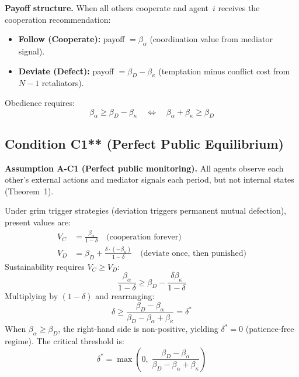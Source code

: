 \documentclass[11pt]{article}
\begin{document}
\textbf{Payoff structure.} When all others cooperate and agent~$i$ receives the cooperation recommendation:
\begin{itemize}
\item \textbf{Follow (Cooperate):} payoff $= \beta_\alpha$ (coordination value from mediator signal).
\item \textbf{Deviate (Defect):} payoff $= \beta_D - \beta_\kappa$ (temptation minus conflict cost from $N{-}1$ retaliators).
\end{itemize}
Obedience requires:
\begin{equation}
\beta_\alpha \geq \beta_D - \beta_\kappa \quad \Longleftrightarrow \quad \beta_\alpha + \beta_\kappa \geq \beta_D
\end{equation}

\subsection{Condition C1** (Perfect Public Equilibrium)}
\label{sec:S4.2}

\textbf{Assumption A-C1 (Perfect public monitoring).} All agents observe each other's external actions and mediator signals each period, but not internal states (Theorem~1).

Under grim trigger strategies (deviation triggers permanent mutual defection), present values are:
\begin{align}
V_C &= \frac{\beta_\alpha}{1 - \delta} \quad \text{(cooperation forever)} \\
V_D &= \beta_D + \frac{\delta \cdot (-\beta_\kappa)}{1 - \delta} \quad \text{(deviate once, then punished)}
\end{align}
Sustainability requires $V_C \geq V_D$:
\begin{equation}
\frac{\beta_\alpha}{1-\delta} \geq \beta_D - \frac{\delta \beta_\kappa}{1-\delta}
\end{equation}
Multiplying by $(1-\delta)$ and rearranging:
\begin{equation}
\delta \geq \frac{\beta_D - \beta_\alpha}{\beta_D - \beta_\alpha + \beta_\kappa} = \delta^*
\end{equation}
When $\beta_\alpha \geq \beta_D$, the right-hand side is non-positive, yielding $\delta^* = 0$ (patience-free regime). The critical threshold is:
\begin{equation}
\delta^* = \max\left(0,\; \frac{\beta_D - \beta_\alpha}{\beta_D - \beta_\alpha + \beta_\kappa}\right)
\end{equation}
\end{document}
